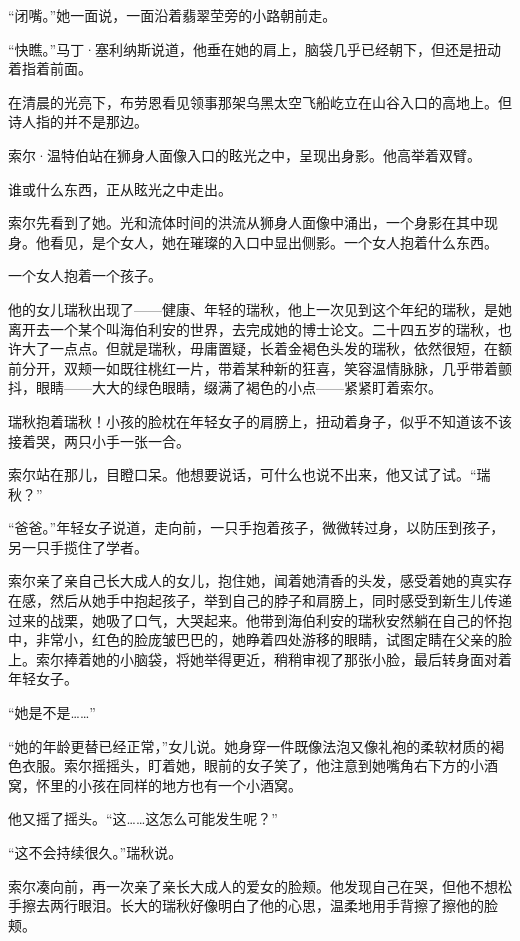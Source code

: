\documentclass[AutoFakeBold=true]{book}
\begin{document}
``闭嘴。''她一面说，一面沿着翡翠茔旁的小路朝前走。

``快瞧。''马丁·塞利纳斯说道，他垂在她的肩上，脑袋几乎已经朝下，但还是扭动着指着前面。

在清晨的光亮下，布劳恩看见领事那架乌黑太空飞船屹立在山谷入口的高地上。但诗人指的并不是那边。

索尔·温特伯站在狮身人面像入口的眩光之中，呈现出身影。他高举着双臂。

谁或什么东西，正从眩光之中走出。

\vspace*{1em}

索尔先看到了她。光和流体时间的洪流从狮身人面像中涌出，一个身影在其中现身。他看见，是个女人，她在璀璨的入口中显出侧影。一个女人抱着什么东西。

一个女人抱着一个孩子。

他的女儿瑞秋出现了——健康、年轻的瑞秋，他上一次见到这个年纪的瑞秋，是她离开去一个某个叫海伯利安的世界，去完成她的博士论文。二十四五岁的瑞秋，也许大了一点点。但就是瑞秋，毋庸置疑，长着金褐色头发的瑞秋，依然很短，在额前分开，双颊一如既往桃红一片，带着某种新的狂喜，笑容温情脉脉，几乎带着颤抖，眼睛——大大的绿色眼睛，缀满了褐色的小点——紧紧盯着索尔。

瑞秋抱着瑞秋！小孩的脸枕在年轻女子的肩膀上，扭动着身子，似乎不知道该不该接着哭，两只小手一张一合。

索尔站在那儿，目瞪口呆。他想要说话，可什么也说不出来，他又试了试。``瑞秋？''

``爸爸。''年轻女子说道，走向前，一只手抱着孩子，微微转过身，以防压到孩子，另一只手揽住了学者。

索尔亲了亲自己长大成人的女儿，抱住她，闻着她清香的头发，感受着她的真实存在感，然后从她手中抱起孩子，举到自己的脖子和肩膀上，同时感受到新生儿传递过来的战栗，她吸了口气，大哭起来。他带到海伯利安的瑞秋安然躺在自己的怀抱中，非常小，红色的脸庞皱巴巴的，她睁着四处游移的眼睛，试图定睛在父亲的脸上。索尔捧着她的小脑袋，将她举得更近，稍稍审视了那张小脸，最后转身面对着年轻女子。

``她是不是……''

``她的年龄更替已经正常，''女儿说。她身穿一件既像法泡又像礼袍的柔软材质的褐色衣服。索尔摇摇头，盯着她，眼前的女子笑了，他注意到她嘴角右下方的小酒窝，怀里的小孩在同样的地方也有一个小酒窝。

他又摇了摇头。``这……这怎么可能发生呢？''

``这不会持续很久。''瑞秋说。

索尔凑向前，再一次亲了亲长大成人的爱女的脸颊。他发现自己在哭，但他不想松手擦去两行眼泪。长大的瑞秋好像明白了他的心思，温柔地用手背擦了擦他的脸颊。
\end{document}
